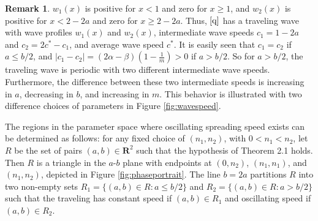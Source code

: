 \documentclass[11pt]{article}
\theoremstyle{definition}
\newtheorem{rem}[thm]{Remark}
\numberwithin{equation}{section}
\numberwithin{thm}{section}
\begin{document}
\begin{rem}
$w_1(x)$ is positive for $x<1$ and zero for $x\geq1$, and $w_2(x)$ is positive for $x<2-2a$ and zero for $x\geq 2-2a$. Thus, $\eqref{q}$ has a traveling wave with wave profiles $w_1(x)$ and $w_2(x)$, intermediate wave speeds $c_1=1-2a$ and $c_2=2c^*-c_1$,  and average wave speed  $c^*$.  It is easily seen that $c_1=c_2$ if $a \leq b/2$, and $|c_1-c_2|=(2\alpha-\beta)(1-\frac{1}{m})>0$ if $a>b/2$. So for $a>b/2$, the traveling wave is periodic with two different intermediate wave speeds. Furthermore, the difference between these two intermediate speeds is increasing in $a$, decreasing in $b$, and increasing in $m$. This behavior is illustrated with two difference choices of parameters in Figure \ref{fig:wavespeed}.
\end{rem}


The regions in the parameter space where oscillating spreading speed exists can be determined as follows: for any fixed choice of $(n_1,n_2)$, with $0<n_1<n_2$, let $R$ be the set of pairs $(a,b)\in\mathbf R^2$ such that the hypothesis of Theorem 2.1 holds. Then $R$ is a triangle in the $a$-$b$ plane with endpoints at $(0,n_2)$, $(n_1,n_1)$, and $(n_1,n_2)$, depicted in Figure \ref{fig:phaseportrait}. The line $b=2a$ partitions $R$ into two non-empty sets $R_1=\{(a,b)\in R:a\leq b/2\}$ and $R_2=\{(a,b)\in R:a> b/2\}$ such that the traveling has constant speed if $(a,b)\in R_1$ and oscillating speed if $(a,b)\in R_2$.
\end{document}
